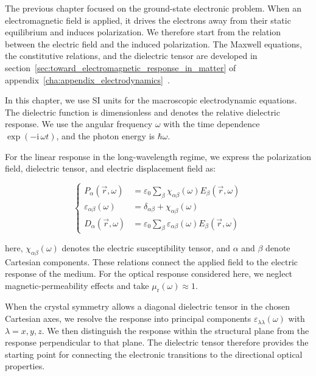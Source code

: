 The previous chapter focused on the ground-state electronic problem.
When an electromagnetic field is applied, it drives the electrons away from their static equilibrium and induces polarization.
We therefore start from the relation between the electric field and the induced polarization.
The Maxwell equations, the constitutive relations, and the dielectric tensor are developed in section~\ref{sec:toward_electromagnetic_response_in_matter} of appendix~\ref{cha:appendix_electrodynamics}~\cite{landau2013electrodynamics,griffiths2023introduction}.

In this chapter, we use SI units for the macroscopic electrodynamic equations.
The dielectric function is dimensionless and denotes the relative dielectric response.
We use the angular frequency $\omega$ with the time dependence $\exp(-\mathrm{i}\,\omega t)$,
and the photon energy is $\hbar\omega$.

For the linear response in the long-wavelength regime,
we express the polarization field, dielectric tensor, and electric displacement field as:

\begin{equation}
\left\{\begin{aligned}
    P_\alpha(\vec{r},\omega)
    &= \varepsilon_0\sum_\beta\chi_{\alpha\beta}(\omega)E_\beta(\vec{r},\omega) \\
    \varepsilon_{\alpha\beta}(\omega)
    &= \delta_{\alpha\beta}+\chi_{\alpha\beta}(\omega) \\
    D_\alpha(\vec{r},\omega)
    &= \varepsilon_0\sum_\beta\varepsilon_{\alpha\beta}(\omega)E_\beta(\vec{r},\omega)
\end{aligned}\right.
\label{working_constitutive_relations_for_optical_response}
\end{equation}

here, $\chi_{\alpha\beta}(\omega)$ denotes the electric susceptibility tensor,
and $\alpha$ and $\beta$ denote Cartesian components.
These relations connect the applied field to the electric response of the medium.
For the optical response considered here, we neglect magnetic-permeability effects and take $\mu_{\mathrm{r}}(\omega)\approx1$.

When the crystal symmetry allows a diagonal dielectric tensor in the chosen Cartesian axes,
we resolve the response into principal components $\varepsilon_{\lambda\lambda}(\omega)$ with $\lambda=x,y,z$.
We then distinguish the response within the structural plane from the response perpendicular to that plane.
The dielectric tensor therefore provides the starting point for connecting the electronic transitions to the directional optical properties.

